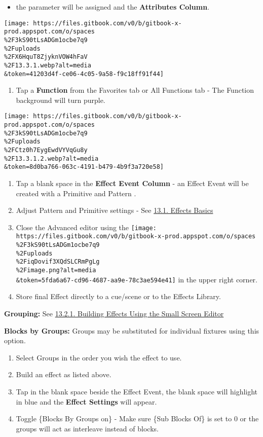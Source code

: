 \documentclass[
]{article}
\providecommand{\tightlist}{%
  \setlength{\itemsep}{0pt}\setlength{\parskip}{0pt}}
\begin{document}
\begin{itemize}
\tightlist
\item
  the parameter will be assigned and the \textbf{Attributes Column}.
\end{itemize}

\texttt{[image: https://files.gitbook.com/v0/b/gitbook-x-prod.appspot.com/o/spaces\\\%2F3kS90tLsADGm1ocbe7q9\\\%2Fuploads\\\%2FX6HquT8ZjyknVOW4hFaV\\\%2F13.3.1.webp?alt=media\\\&token=41203d4f-ce06-4c05-9a58-f9c18ff91f44]}

\begin{enumerate}
\def\labelenumi{\arabic{enumi}.}
\setcounter{enumi}{5}
\tightlist
\item
  Tap a \textbf{Function} from the Favorites tab or All Functions tab - The Function background will turn purple.
\end{enumerate}

\texttt{[image: https://files.gitbook.com/v0/b/gitbook-x-prod.appspot.com/o/spaces\\\%2F3kS90tLsADGm1ocbe7q9\\\%2Fuploads\\\%2FCtz0h7EygEwdVYVqGu8y\\\%2F13.3.1.2.webp?alt=media\\\&token=8d0ba766-063c-4191-b479-4b9f3a720e58]}

\begin{enumerate}
\def\labelenumi{\arabic{enumi}.}
\setcounter{enumi}{6}
\item
  Tap a blank space in the \textbf{Effect Event Column} - an Effect Event will be created with a Primitive and Pattern .
\item
  Adjust Pattern and Primitive settings - See \href{https://vibemanual.compulite.com/effects-1.html\#effect-basics}{13.1. Effects Basics}
\item
  Close the Advanced editor using the \texttt{[image: https://files.gitbook.com/v0/b/gitbook-x-prod.appspot.com/o/spaces\\\%2F3kS90tLsADGm1ocbe7q9\\\%2Fuploads\\\%2FiqDovif3XQdSLCRmPgLg\\\%2Fimage.png?alt=media\\\&token=5fda6a67-cd96-4687-aa9e-78c3ae594e41]} in the upper right corner.
\item
  Store final Effect directly to a cue/scene or to the Effects Library.
\end{enumerate}

\textbf{Grouping:} See \href{https://vibemanual.compulite.com/effects-1.html\#building-effects-using-the-small-screen-editor}{13.2.1. Building Effects Using the Small Screen Editor}

\textbf{Blocks by Groups:} Groups may be substituted for individual fixtures using this option.

\begin{enumerate}
\def\labelenumi{\arabic{enumi}.}
\item
  Select Groups in the order you wish the effect to use.
\item
  Build an effect as listed above.
\item
  Tap in the blank space beside the Effect Event, the blank space will highlight in blue and the \textbf{Effect Settings} will appear.
\item
  Toggle \{Blocks By Groups on\} - Make sure \{Sub Blocks Of\} is set to 0 or the groups will act as interleave instead of blocks.
\end{enumerate}
\end{document}
